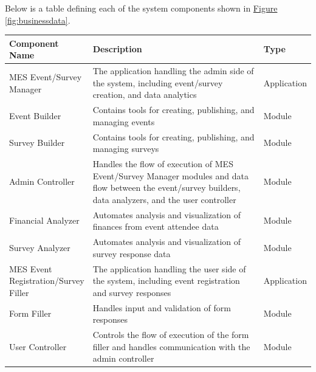 \documentclass[12pt]{article}
\begin{document}
Below is a table defining each of the system components shown in \hyperref[fig:businessdata]{Figure \ref{fig:businessdata}}.
{
\setlength{\tabcolsep}{0.3em}
\renewcommand{\arraystretch}{1.2}
\begin{table}[H]
    \begin{tabular}{p{0.25\linewidth}p{0.6\linewidth}p{0.2\linewidth}}
      \toprule
      \textbf{Component Name}              & \textbf{Description}                                                                                                                                       & \textbf{Type} \\ \midrule
        MES Event/Survey Manager             & The application handling the admin side of the system, including event/survey creation, and data analytics                                                 & Application   \\ \midrule
        Event Builder                        & Contains tools for creating, publishing, and managing events                                                                                               & Module        \\ \midrule
        Survey Builder                       & Contains tools for creating, publishing, and managing surveys                                                                                              & Module        \\ \midrule
        Admin Controller                     & Handles the flow of execution of MES Event/Survey Manager modules and data flow between the event/survey builders, data analyzers, and the user controller & Module        \\ \midrule
        Financial Analyzer                   & Automates analysis and visualization of finances from event attendee data                                                                                  & Module        \\ \midrule 
        Survey Analyzer                      & Automates analysis and visualization of survey response data                                                                                               & Module        \\ \midrule
        MES Event Registration/Survey Filler & The application handling the user side of the system, including event registration and survey responses                                                    & Application   \\ \midrule
        Form Filler                          & Handles input and validation of form responses                                                                                                             & Module        \\ \midrule
        User Controller                      & Controls the flow of execution of the form filler and handles communication with the admin controller                                                      & Module        \\ \midrule
    \end{tabular}
    \label{table:datadictionary}
\end{table}
}
\end{document}
